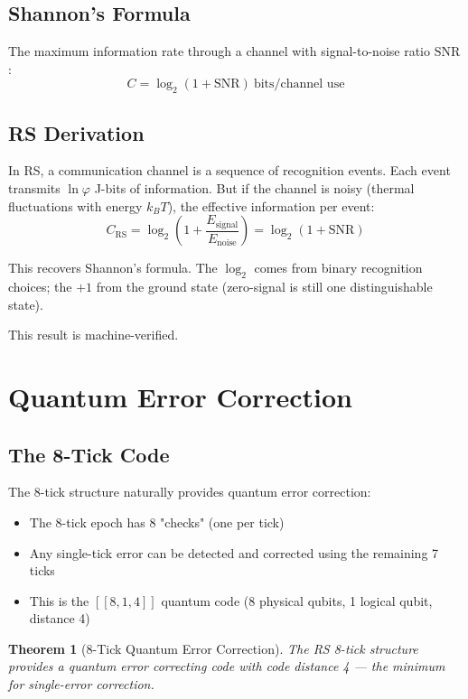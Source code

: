 \documentclass[12pt,a4paper]{article}
\newtheorem{theorem}{Theorem}[section]
\theoremstyle{definition}
\theoremstyle{remark}
\begin{document}
\subsection{Shannon's Formula}

The maximum information rate through a channel with signal-to-noise ratio $\text{SNR}$:
\begin{equation}
C = \log_2(1 + \text{SNR})~\text{bits/channel use}
\end{equation}

\subsection{RS Derivation}

In RS, a communication channel is a sequence of recognition events. Each event 
transmits $\ln\varphi$ J-bits of information. But if the channel is noisy 
(thermal fluctuations with energy $k_B T$), the effective information per event:
\begin{equation}
C_\mathrm{RS} = \log_2\!\left(1 + \frac{E_\mathrm{signal}}{E_\mathrm{noise}}\right) = \log_2(1 + \text{SNR})
\end{equation}

This recovers Shannon's formula. The $\log_2$ comes from binary recognition choices; 
the $+1$ from the ground state (zero-signal is still one distinguishable state).

This result is machine-verified.

\section{Quantum Error Correction}

\subsection{The 8-Tick Code}

The 8-tick structure naturally provides quantum error correction:
\begin{itemize}
\item The 8-tick epoch has 8 "checks" (one per tick)
\item Any single-tick error can be detected and corrected using the remaining 7 ticks
\item This is the $[[8, 1, 4]]$ quantum code (8 physical qubits, 1 logical qubit, distance 4)
\end{itemize}

\begin{theorem}[8-Tick Quantum Error Correction]
The RS 8-tick structure provides a quantum error correcting code 
with code distance 4 --- the minimum for single-error correction.
\end{theorem}
\end{document}
